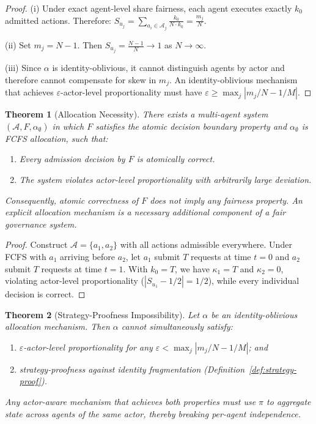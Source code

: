 \documentclass[11pt]{article}
\newtheorem{theorem}{Theorem}[section]
\newcommand{\Agents}{\mathcal{A}}
\newcommand{\Share}[1]{S_{#1}}
\newcommand{\kbound}{k_0}
\begin{document}
\begin{proof}
(i) Under exact agent-level share fairness, each agent executes exactly $\kbound$ admitted actions. Therefore: $\Share{u_j} = \sum_{a_i \in \Agents_j} \frac{\kbound}{N \cdot \kbound} = \frac{m_j}{N}$.

(ii) Set $m_j = N - 1$. Then $\Share{u_j} = \frac{N-1}{N} \to 1$ as $N \to \infty$.

(iii) Since $\alpha$ is identity-oblivious, it cannot distinguish agents by actor and therefore cannot compensate for skew in $m_j$. An identity-oblivious mechanism that achieves $\varepsilon$-actor-level proportionality must have $\varepsilon \geq \max_j |m_j/N - 1/M|$.
\end{proof}

\begin{theorem}[Allocation Necessity]
\label{thm:necessity}
There exists a multi-agent system $(\Agents, F, \alpha_{\emptyset})$ in which $F$ satisfies the atomic decision boundary property and $\alpha_{\emptyset}$ is FCFS allocation, such that:
\begin{enumerate}[label=(\roman*)]
  \item Every admission decision by $F$ is atomically correct.
  \item The system violates actor-level proportionality with arbitrarily large deviation.
\end{enumerate}
Consequently, atomic correctness of $F$ does not imply any fairness property. An explicit allocation mechanism is a \emph{necessary additional component} of a fair governance system.
\end{theorem}

\begin{proof}
Construct $\Agents = \{a_1, a_2\}$ with all actions admissible everywhere. Under FCFS with $a_1$ arriving before $a_2$, let $a_1$ submit $T$ requests at time $t=0$ and $a_2$ submit $T$ requests at time $t=1$. With $\kbound = T$, we have $\kappa_1 = T$ and $\kappa_2 = 0$, violating actor-level proportionality ($|\Share{u_1} - 1/2| = 1/2$), while every individual decision is correct.
\end{proof}

\begin{theorem}[Strategy-Proofness Impossibility]
\label{thm:strategy}
Let $\alpha$ be an identity-oblivious allocation mechanism. Then $\alpha$ cannot simultaneously satisfy:
\begin{enumerate}[label=(\roman*)]
  \item $\varepsilon$-actor-level proportionality for any $\varepsilon < \max_j |m_j/N - 1/M|$; and
  \item strategy-proofness against identity fragmentation (Definition~\ref{def:strategy-proof}).
\end{enumerate}
Any actor-aware mechanism that achieves both properties must use $\pi$ to aggregate state across agents of the same actor, thereby breaking per-agent independence.
\end{theorem}
\end{document}
